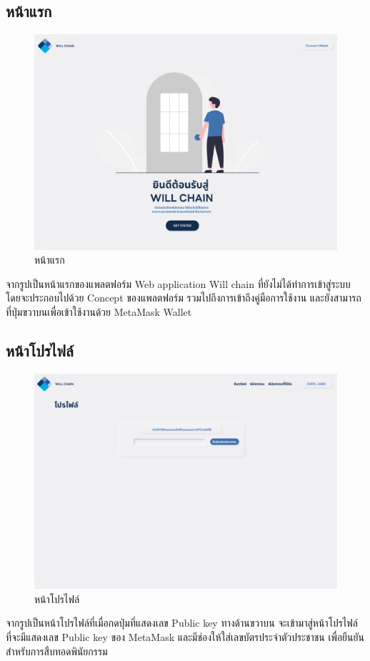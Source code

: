 \documentclass[12pt,oneside,openright,a4paper]{cpe-thai-project}
\begin{document}
\subsection{หน้าแรก}
		\begin{figure}[!thb]
			\centering
			\includegraphics[scale=0.2]{Home}
			\caption{หน้าแรก}
		\end{figure}
		\FloatBarrier
		\tab จากรูปเป็นหน้าแรกของแพลตฟอร์ม Web application Will chain ที่ยังไม่ได้ทำการเข้าสู่ระบบ โดยจะประกอบไปด้วย Concept ของแพลตฟอร์ม รวมไปถึงการเข้าถึงคู่มือการใช้งาน และยังสามารถที่ปุ่มขวาบนเพื่อเข้าใช้งานด้วย MetaMask Wallet
\subsection{หน้าโปรไฟล์}
		\begin{figure}[!thb]
			\centering
			\includegraphics[scale=0.2]{profile}
			\caption{หน้าโปรไฟล์}
		\end{figure}
		\FloatBarrier
		\tab จากรูปเป็นหน้าโปรไฟล์ที่เมื่อกดปุ่มที่แสดงเลข Public key ทางด้านขวาบน จะเข้ามาสู่หน้าโปรไฟล์ ที่จะมีแสดงเลข Public key ของ MetaMask และมีช่องให้ใส่เลขบัตรประจำตัวประชาชน เพื่อยืนยันสำหรับการสืบทอดพินัยกรรม
\end{document}
